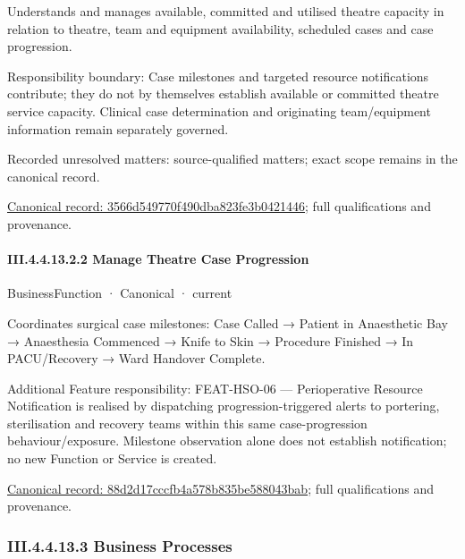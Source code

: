 Understands and manages available, committed and utilised theatre capacity in relation to theatre, team and equipment availability, scheduled cases and case progression.



Responsibility boundary: Case milestones and targeted resource notifications contribute; they do not by themselves establish available or committed theatre service capacity. Clinical case determination and originating team/equipment information remain separately governed.


{\small Recorded unresolved matters: source-qualified matters; exact scope remains in the canonical record.}\par
{\footnotesize \href{../../../../../../../continuum/business/business-function/3566d549770f490dba823fe3b0421446.md}{Canonical record: 3566d549770f490dba823fe3b0421446}; full qualifications and provenance.}\par
\paragraph*{III.4.4.13.2.2 Manage Theatre Case Progression}
\label{navigation:III.4.4.13.2.2}

\label{element:88d2d17cccfb4a578b835be588043bab}
{\small BusinessFunction · Canonical · current}\par

Coordinates surgical case milestones: Case Called → Patient in Anaesthetic Bay → Anaesthesia Commenced → Knife to Skin → Procedure Finished → In PACU/Recovery → Ward Handover Complete.



Additional Feature responsibility: FEAT-HSO-06 — Perioperative Resource Notification is realised by dispatching progression-triggered alerts to portering, sterilisation and recovery teams within this same case-progression behaviour/exposure. Milestone observation alone does not establish notification; no new Function or Service is created.


{\footnotesize \href{../../../../../../../continuum/business/business-function/88d2d17cccfb4a578b835be588043bab.md}{Canonical record: 88d2d17cccfb4a578b835be588043bab}; full qualifications and provenance.}\par
\subsubsection*{III.4.4.13.3 Business Processes}
\label{navigation:III.4.4.13.3}

